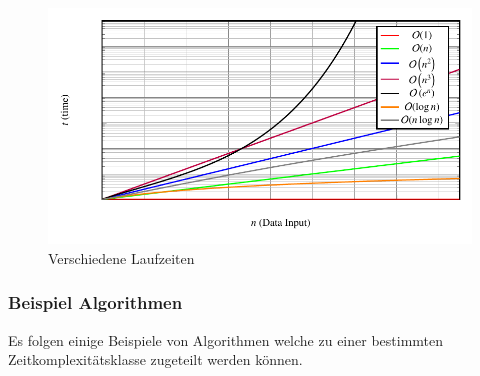 \begin{figure}
	\center
	\includegraphics[]{papers/multiplikation/images/bigo}
	\caption{Verschiedene Laufzeiten}
	\label{multiplikation:fig:bigo}
\end{figure}

\subsubsection{Beispiel Algorithmen}

Es folgen einige Beispiele von Algorithmen welche zu einer bestimmten Zeitkomplexit\"atsklasse zugeteilt werden k\"onnen.

